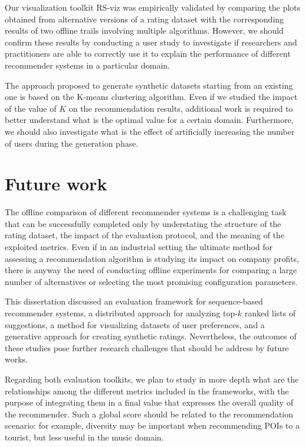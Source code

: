 Our visualization toolkit RS-viz was empirically validated by comparing the plots obtained from alternative versions of a rating dataset with the corresponding results of two offline trails involving multiple algorithms. However, we should confirm these results by conducting a user study to investigate if researchers and practitioners are able to correctly use it to explain the performance of different recommender systems in a particular domain.

The approach proposed to generate synthetic datasets starting from an existing one is based on the K-means clustering algorithm. Even if we studied the impact of the value of $K$ on the recommendation results, additional work is required to better understand what is the optimal value for a certain domain. Furthermore, we should also investigate what is the effect of artificially increasing the number of users during the generation phase.

\section{Future work}

The offline comparison of different recommender systems is a challenging task that can be successfully completed only by understating the structure of the rating dataset, the impact of the evaluation protocol, and the meaning of the exploited metrics. Even if in an industrial setting the ultimate method for assessing a recommendation algorithm is studying its impact on company profits, there is anyway the need of conducting offline experiments for comparing a large number of alternatives or selecting the most promising configuration parameters.

This dissertation discussed an evaluation framework for sequence-based recommender systems, a distributed approach for analyzing top-$k$ ranked lists of suggestions, a method for visualizing datasets of user preferences, and a generative approach for creating synthetic ratings. Nevertheless, the outcomes of these studies pose further research challenges that should be address by future works.

Regarding both evaluation toolkits, we plan to study in more depth what are the relationships among the different metrics included in the frameworks, with the purpose of integrating them in a final value that expresses the overall quality of the recommender. Such a global score should be related to the recommendation scenario: for example, diversity may be important when recommending POIs to a tourist, but less useful in the music domain.

